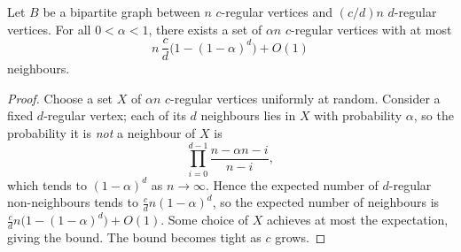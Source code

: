 \begin{theorem}
  \label{thm:upper-expansion}
  Let $B$ be a bipartite graph between $n$ $c$-regular vertices and $(c/d)n$
  $d$-regular vertices. For all $0<\alpha<1$, there exists a set of $\alpha n$
  $c$-regular vertices with at most
  \[
    n\,\frac{c}{d}\bigl(1-(1-\alpha)^d\bigr) + O(1)
  \]
  neighbours.
\end{theorem}
\begin{proof}
  Choose a set $X$ of $\alpha n$ $c$-regular vertices uniformly at random.
  Consider a fixed $d$-regular vertex; each of its $d$ neighbours lies in $X$
  with probability $\alpha$, so the probability it is \emph{not} a neighbour of
  $X$ is
  \[
    \prod_{i=0}^{d-1}\frac{n-\alpha n-i}{n-i},
  \]
  which tends to $(1-\alpha)^d$ as $n\to\infty$. Hence the expected number of
  $d$-regular non-neighbours tends to $\frac{c}{d}n(1-\alpha)^d$, so the
  expected number of neighbours is $\frac{c}{d}n\bigl(1-(1-\alpha)^d\bigr)+O(1)$.
  Some choice of $X$ achieves at most the expectation, giving the bound. The
  bound becomes tight as $c$ grows.
\end{proof}

